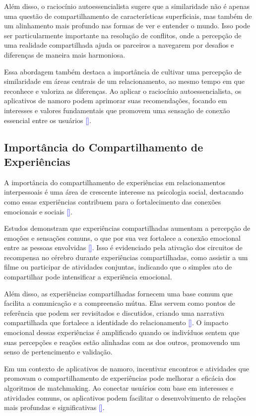 Além disso, o raciocínio autoessencialista sugere que a similaridade não é apenas uma questão de compartilhamento de características superficiais, mas também de um alinhamento mais profundo nas formas de ver e entender o mundo. Isso pode ser particularmente importante na resolução de conflitos, onde a percepção de uma realidade compartilhada ajuda os parceiros a navegarem por desafios e diferenças de maneira mais harmoniosa.

Essa abordagem também destaca a importância de cultivar uma percepção de similaridade em áreas centrais de um relacionamento, ao mesmo tempo em que reconhece e valoriza as diferenças. Ao aplicar o raciocínio autoessencialista, os aplicativos de namoro podem aprimorar suas recomendações, focando em interesses e valores fundamentais que promovem uma sensação de conexão essencial entre os usuários \textcolor{blue}{[\cite{Montoya2013}]}.

\subsection{Importância do Compartilhamento de Experiências}
A importância do compartilhamento de experiências em relacionamentos interpessoais é uma área de crescente interesse na psicologia social, destacando como essas experiências contribuem para o fortalecimento das conexões emocionais e sociais \textcolor{blue}{[\cite{Berscheid1998}]}.

Estudos demonstram que experiências compartilhadas aumentam a percepção de emoções e sensações comuns, o que por sua vez fortalece a conexão emocional entre as pessoas envolvidas \textcolor{blue}{[\cite{Byrne1971}]}. Isso é evidenciado pela ativação dos circuitos de recompensa no cérebro durante experiências compartilhadas, como assistir a um filme ou participar de atividades conjuntas, indicando que o simples ato de compartilhar pode intensificar a experiência emocional.

Além disso, as experiências compartilhadas fornecem uma base comum que facilita a comunicação e a compreensão mútua. Elas servem como pontos de referência que podem ser revisitados e discutidos, criando uma narrativa compartilhada que fortalece a identidade do relacionamento \textcolor{blue}{[\cite{Montoya2013}]}. O impacto emocional dessas experiências é amplificado quando os indivíduos sentem que suas percepções e reações estão alinhadas com as dos outros, promovendo um senso de pertencimento e validação.

Em um contexto de aplicativos de namoro, incentivar encontros e atividades que promovam o compartilhamento de experiências pode melhorar a eficácia dos algoritmos de matchmaking. Ao conectar usuários com base em interesses e atividades comuns, os aplicativos podem facilitar o desenvolvimento de relações mais profundas e significativas \textcolor{blue}{[\cite{Chu2023}]}.


